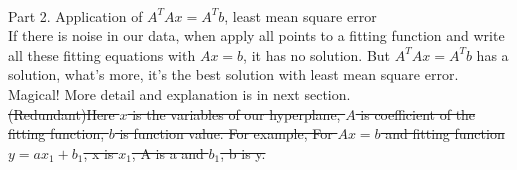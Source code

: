 \documentclass{article}
\begin{document}
\begin{spacing}{1.5}
\\Part 2. Application of $A^TAx=A^Tb$, least mean square error\\
If there is noise in our data, when apply all points to a fitting function and write all these fitting equations with $Ax=b$, it has no solution. But $A^TAx=A^Tb$ has a solution, what's more, it's the best solution with least mean square error. Magical! More detail and explanation is in next section.\\
\sout{(Redundant)Here $x$ is the variables of our hyperplane, $A$ is coefficient of the fitting function, $b$ is function value. For example, For $Ax=b$ and fitting function $y=ax_1+b_1$, x is $x_1$, A is a and $b_1$, b is y. }\par
\end{spacing}
\end{document}
